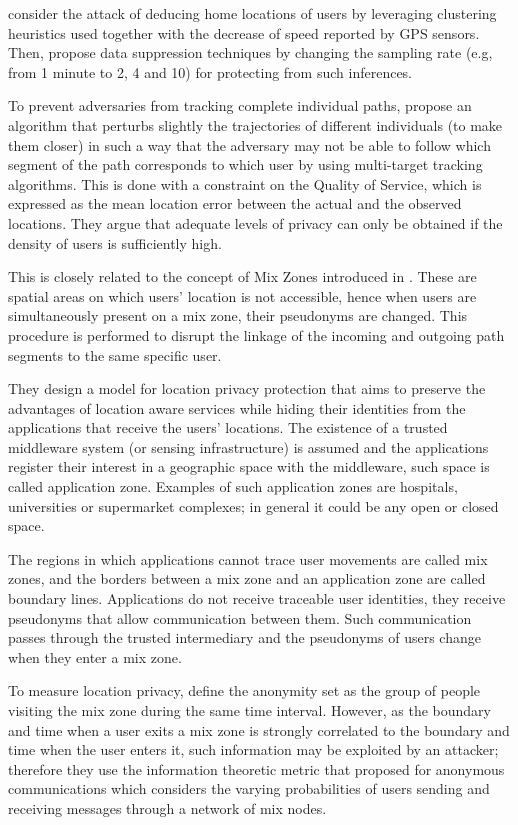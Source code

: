 \cite{Hoh06} consider the attack of deducing home locations of users by leveraging clustering heuristics used together with the decrease of speed reported by GPS sensors. Then, propose data suppression techniques by changing the sampling rate (e.g, from 1 minute to 2, 4 and 10) for protecting from such inferences.

To prevent adversaries from tracking complete individual paths, \cite{Hoh2005} propose an algorithm that perturbs slightly the trajectories of different individuals (to make them closer) in such a way that the adversary may not be able to follow which segment of the path corresponds to which user by using multi-target tracking algorithms.
This is done with a constraint on the Quality of Service, which is expressed as the mean location error between the actual and the observed locations. They argue that adequate levels of privacy can only be obtained if the density of users is sufficiently high.


This is closely related to the concept of Mix Zones introduced in \cite{Beresford2003}. These are spatial areas on which users' location is not accessible, hence when users are simultaneously present on a mix zone, their pseudonyms are changed. This procedure is performed to disrupt the linkage of the incoming and outgoing path segments to the same specific user.

They design a model for location privacy protection that aims to preserve the advantages of location aware services while hiding their identities from the applications that receive the users' locations.
The existence of a trusted middleware system (or sensing infrastructure) is assumed and the applications register their interest in a geographic space with the middleware, such space is called application zone. Examples of such application zones are hospitals, universities or supermarket complexes; in general it could be any open or closed space.

The regions in which applications cannot trace user movements are called mix zones, and the borders between a mix zone and an application zone are called boundary lines.
Applications do not receive traceable user identities, they receive pseudonyms that allow communication between them. Such communication passes through the trusted intermediary and the pseudonyms of users change when they enter a mix zone.


To measure location privacy, \cite{Beresford04mixzones} define the anonymity set as the group of people visiting the mix zone during the same time interval. However, as the boundary and time when a user exits a mix zone is strongly correlated to the boundary and time when the user enters it, such information may be exploited by an attacker; therefore they use the information theoretic metric that \cite{Serjantov2002} proposed for anonymous communications which considers the varying probabilities of users sending and receiving messages through a network of mix nodes.


